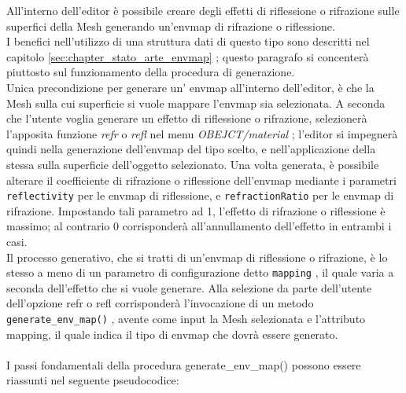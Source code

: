 All’interno dell’editor è possibile creare degli effetti di riflessione o rifrazione sulle superfici della Mesh generando un’envmap di rifrazione o riflessione.
\\
I benefici nell’utilizzo di una struttura dati di questo tipo sono descritti nel capitolo \ref{sec:chapter_stato_arte_envmap} ; questo paragrafo si concenterà piuttosto sul funzionamento della procedura di generazione. 
\\
Unica precondizione per generare un’ envmap all’interno dell’editor, è che la Mesh sulla cui superficie si vuole mappare l’envmap sia selezionata. A seconda che l’utente voglia generare un effetto di riflessione o rifrazione, selezionerà l’apposita funzione \emph{refr} o \emph{refl} nel menu \emph{OBEJCT/material} ; l’editor si impegnerà quindi nella generazione dell’envmap del tipo scelto, e nell’applicazione della stessa sulla superficie dell’oggetto selezionato. Una volta generata, è possibile alterare il coefficiente di rifrazione o riflessione dell’envmap mediante i parametri \texttt{reflectivity} per le envmap di riflessione, e \texttt{refractionRatio} per le envmap di rifrazione. Impostando tali parametro ad 1, l’effetto di rifrazione o riflessione è massimo; al contrario 0 corrisponderà all’annullamento dell’effetto in entrambi i casi.
\\
Il processo generativo, che si tratti di un’envmap di riflessione o rifrazione, è lo stesso a meno di un parametro di configurazione detto \texttt{mapping} , il quale varia a seconda dell’effetto che si vuole generare. Alla selezione da parte dell’utente dell'opzione refr o refl corrisponderà l’invocazione di un metodo \texttt{generate\_env\_map()} , avente come input la Mesh selezionata e l’attributo mapping, il quale indica il tipo di envmap che dovrà essere generato.
\\
\\
I passi fondamentali della procedura generate\_env\_map() possono essere riassunti nel seguente pseudocodice:
\\
